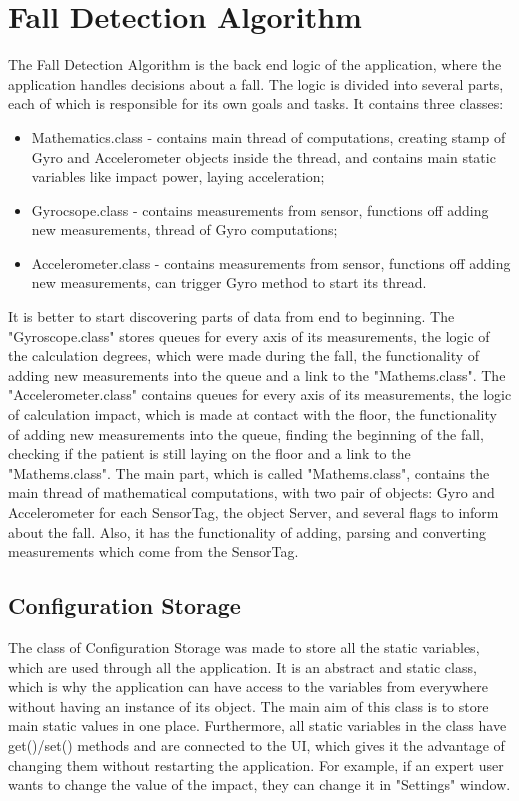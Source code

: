 \documentclass[conference,12pt]{IEEETran}
\begin{document}
\section{Fall Detection Algorithm}
The Fall Detection Algorithm is the back end logic of the application, where the application handles decisions about a fall. The logic is divided into several parts, each of which is responsible for its own goals and tasks. It contains three classes:
\begin{itemize}
	\item Mathematics.class - contains main thread of computations, creating stamp of Gyro and Accelerometer objects inside the thread, and contains main static variables like impact power, laying acceleration;
	\item Gyrocsope.class - contains measurements from sensor, functions off adding new measurements, thread of Gyro computations;
	\item Accelerometer.class - contains measurements from sensor, functions off adding new measurements, can trigger Gyro method to start its thread.
\end{itemize}
It is better to start discovering parts of data from end to beginning. The "Gyroscope.class" stores queues for every axis of its measurements, the logic of the calculation degrees, which were made during the fall, the functionality of adding new measurements into the queue and a link to the "Mathems.class". The "Accelerometer.class" contains queues for every axis of its measurements, the logic of calculation impact, which is made at contact with the floor, the functionality of adding new measurements into the queue, finding the beginning of the fall, checking if the patient is still laying on the floor and a link to the "Mathems.class". The main part, which is called "Mathems.class", contains the main thread of mathematical computations, with two pair of objects: Gyro and Accelerometer for each SensorTag, the object Server, and several flags to inform about the fall. Also, it has the functionality of adding, parsing and converting measurements which come from the SensorTag.

\subsection{Configuration Storage}
The class of Configuration Storage was made to store all the static variables, which are used through all the application. It is an abstract and static class, which is why the application can have access to the variables from everywhere without having an instance of its object. The main aim of this class is to store main static values in one place. Furthermore, all static variables in the class have get()/set() methods and are connected to the UI, which gives it the advantage of changing them without restarting the application. For example, if an expert user wants to change the value of the impact, they can change it in "Settings" window.
\end{document}
